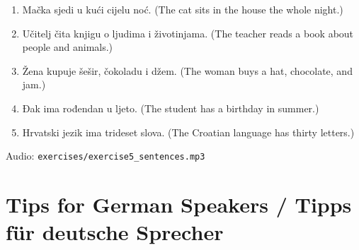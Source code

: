 \begin{enumerate}
    \item Mačka sjedi u kući cijelu noć.
    (The cat sits in the house the whole night.)
    
    \item Učitelj čita knjigu o ljudima i životinjama.
    (The teacher reads a book about people and animals.)
    
    \item Žena kupuje šešir, čokoladu i džem.
    (The woman buys a hat, chocolate, and jam.)
    
    \item Đak ima rođendan u ljeto.
    (The student has a birthday in summer.)
    
    \item Hrvatski jezik ima trideset slova.
    (The Croatian language has thirty letters.)
\end{enumerate}

Audio: \texttt{exercises/exercise5\_sentences.mp3}

\section{Tips for German Speakers / Tipps für deutsche Sprecher}

